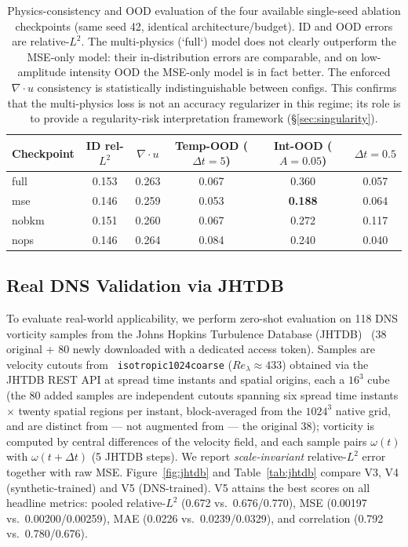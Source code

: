 \documentclass[review]{elsarticle}
\begin{document}
\begin{table}[t]
\centering
\caption{Physics-consistency and OOD evaluation of the four available single-seed ablation checkpoints (same seed 42, identical architecture/budget). ID and OOD errors are relative-$L^2$. The multi-physics (`full`) model does not clearly outperform the MSE-only model: their in-distribution errors are comparable, and on low-amplitude intensity OOD the MSE-only model is in fact better. The enforced $\nabla\cdot u$ consistency is statistically indistinguishable between configs. This confirms that the multi-physics loss is not an accuracy regularizer in this regime; its role is to provide a regularity-risk interpretation framework (\S\ref{sec:singularity}).}
\label{tab:ablation-physics}
\begin{tabular}{lccccc}
\toprule
Checkpoint & ID rel-$L^2$ & $\nabla\cdot u$ & Temp-OOD ($\Delta t{=}5$) & Int-OOD ($A{=}0.05$) & $\Delta t{=}0.5$ \\
\midrule
full & 0.153 & 0.263 & 0.067 & 0.360 & 0.057 \\
mse & 0.146 & 0.259 & 0.053 & \textbf{0.188} & 0.064 \\
nobkm & 0.151 & 0.260 & 0.067 & 0.272 & 0.117 \\
nops & 0.146 & 0.264 & 0.084 & 0.240 & 0.040 \\
\bottomrule
\end{tabular}
\end{table}

\subsection{Real DNS Validation via JHTDB}
\label{sec:jhtdb}

To evaluate real-world applicability, we perform zero-shot evaluation on 118 DNS vorticity samples
from the Johns Hopkins Turbulence Database (JHTDB)~\cite{li2018jhtdb} (38 original + 80 newly
downloaded with a dedicated access token). Samples are velocity cutouts from {\tt
isotropic1024coarse} ($Re_\lambda\approx 433$) obtained via the JHTDB REST API at spread time
instants and spatial origins, each a $16^3$ cube (the 80 added samples are independent
cutouts spanning six spread time instants $\times$ twenty spatial regions per instant,
block-averaged from the $1024^3$ native grid, and are distinct from --- not augmented from
--- the original 38); vorticity is computed by central differences of
the velocity field, and each sample pairs $\omega(t)$ with $\omega(t+\Delta t)$ (5 JHTDB steps).
We report \emph{scale-invariant} relative-$L^2$ error together with raw MSE. Figure~\ref{fig:jhtdb}
and Table~\ref{tab:jhtdb} compare V3, V4 (synthetic-trained) and V5 (DNS-trained). V5 attains the
best scores on all headline metrics: pooled relative-$L^2$ (0.672 vs.~0.676/0.770), MSE
(0.00197 vs.~0.00200/0.00259), MAE (0.0226 vs.~0.0239/0.0329), and correlation (0.792 vs.~0.780/0.676).
\end{document}
